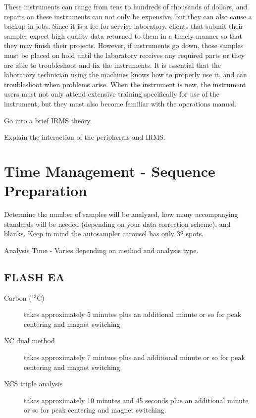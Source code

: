 \documentclass[12pt]{../SOP3_beta}\usepackage[]{graphicx}\usepackage[]{color}
\begin{document}
These instruments can range from tens to hundreds of thousands of dollars, and repairs on these instruments can not only be expensive, but they can also cause a backup in jobs. Since it is a fee for service laboratory, clients that submit their samples expect high quality data returned to them in a timely manner so that they may finish their projects. However, if instruments go down, those samples must be placed on hold until the laboratory receives any required parts or they are able to troubleshoot and fix the instruments. It is essential that the laboratory technician using the machines knows how to properly use it, and can troubleshoot when problems arise. When the instrument is new, the instrument users must not only attend extensive training specifically for use of the instrument, but they must also become familiar with the operations manual.

Go into a brief IRMS theory.

Explain the interaction of the peripherals and IRMS.

\section{Time Management - Sequence Preparation}

\NP Determine the number of samples will be analyzed, how many accompanying standards will be needed (depending on your data correction scheme), and blanks. Keep in mind the autosampler carousel has only 32 spots.

\NP Analysis Time - Varies depending on method and analysis type. 

\subsection{FLASH EA}

\begin{description}

\item[Carbon ($^{13}$C)] 
takes approximately 5 minutes plus an additional minute or so for peak centering and magnet switching.

\item[NC dual method] 
takes approximately 7 mintues plus and additional minute or so for peak centering and magnet switching.

\item[NCS triple analysis] 
takes approximately 10 minutes and 45 seconds plus an additional minute or so for peak centering and magnet switching.

\end{description}
\end{document}
